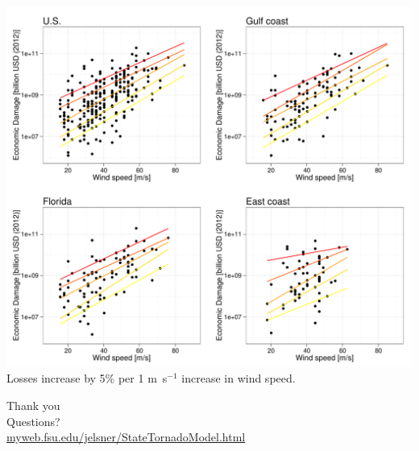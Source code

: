 \documentclass[handout]{beamer}
\begin{document}
\begin{frame}
\begin{center}
\includegraphics[scale=.35]{figures/DamageLoss.pdf}\\
Losses increase by 5\% per 1 m~s$^{-1}$ increase in wind speed.
\end{center}
\end{frame}

\begin{frame}
\huge{Thank you}\\
\huge{Questions?}\\

\large{\url{myweb.fsu.edu/jelsner/StateTornadoModel.html}}

\end{frame}
\end{document}
